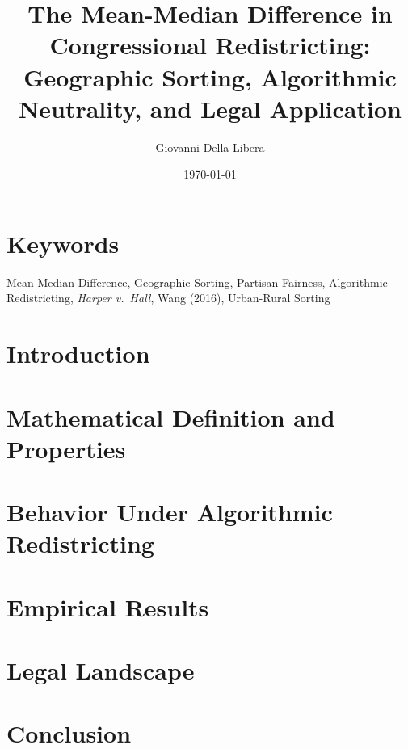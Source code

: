 \documentclass[12pt]{article}
\title{\textbf{The Mean-Median Difference in Congressional Redistricting:\\
Geographic Sorting, Algorithmic Neutrality, and Legal Application}}
\author{Giovanni Della-Libera}
\date{\today}
\begin{document}
\maketitle

\begin{abstract}

\end{abstract}

\section*{Keywords}
Mean-Median Difference, Geographic Sorting, Partisan Fairness, Algorithmic Redistricting,
\textit{Harper v.\ Hall}, Wang (2016), Urban-Rural Sorting

\section{Introduction}


\section{Mathematical Definition and Properties}


\section{Behavior Under Algorithmic Redistricting}


\section{Empirical Results}


\section{Legal Landscape}


\section{Conclusion}




\end{document}
